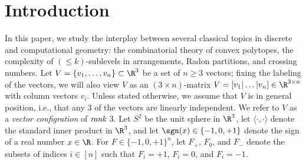 \section{Introduction}
\label{s:intro}
In this paper, we study the interplay between several classical topics in discrete and computational geometry: the combinatorial theory of convex polytopes, the complexity of $(\leq k)$-sublevels in arrangements, Radon partitions, and crossing numbers.
%
Let $V = \{ v_1, \ldots, v_n \} \subset \R^3$ be a set of $n\geq 3$ vectors; fixing the labeling of the vectors, we will also view $V$ as an $(3 \times n)$-matrix $V=[v_1|\dots|v_n] \in \R^{3 \times n}$ with column vectors $v_i$. Unless stated otherwise, we assume that $V$ is in general position, i.e., that any $3$ of the vectors are linearly independent. We refer to $V$ as a \emph{vector configration} of $\emph{rank}$ $3$. 
%
Let $S^2$ be the unit sphere in $\R^3$, let $\langle\cdot ,\cdot \rangle$ denote the standard inner product in $\R^3$, and let $\sgn(x)\in \{-1,0,+1\}$ denote the sign of a real number $x\in \R$. 
For $F\in \{-1,0,+1\}^n$, let $F_+$, $F_0$, and $F_-$ denote the subsets of indices $i\in [n]$ such that $F_i=+1$, $F_i=0$, and $F_i=-1$.
%
%
